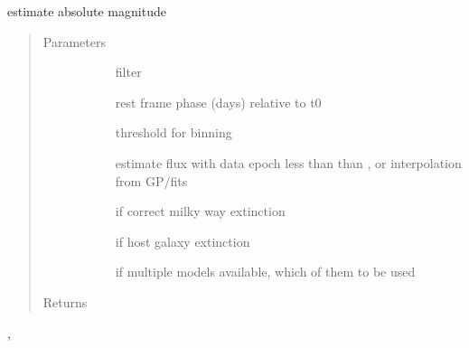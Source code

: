 \documentclass[letterpaper,10pt,english]{sphinxmanual}
\begin{document}
\begin{fulllineitems}
\label{\detokenize{generated/sdapy.snerun.snobject._absmag_at:sdapy.snerun.snobject._absmag_at}}
estimate absolute magnitude
\begin{quote}\begin{description}
\item[{Parameters}] \leavevmode\begin{description}
\item[{}] \leavevmode{[}\sphinxtitleref{str}{]}
filter

\item[{}] \leavevmode{[}\sphinxtitleref{float}{]}
rest frame phase (days) relative to t0

\item[{}] \leavevmode{[}\sphinxtitleref{float}{]}
threshold for binning

\item[{}] \leavevmode{[}\sphinxtitleref{str}{]}
estimate flux with data epoch less than than , or interpolation from GP/fits

\item[{}] \leavevmode{[}\sphinxtitleref{bool}{]}
if correct milky way extinction

\item[{}] \leavevmode{[}\sphinxtitleref{bool}{]}
if host galaxy extinction

\item[{}] \leavevmode{[}\sphinxtitleref{int}{]}
if multiple models available, which of them to be used

\end{description}

\item[{Returns}] \leavevmode\begin{description}
\item[{}] \leavevmode{[}\sphinxtitleref{float}{]}
\item[{}] \leavevmode{[}\sphinxtitleref{float}{]}
\end{description}

\end{description}\end{quote}



\begin{description}
\item[{, }] \leavevmode
\end{description}



\end{fulllineitems}
\end{document}

